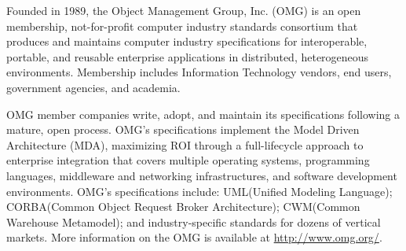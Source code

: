\documentclass[10pt, a4paper]{isov2}
\begin{document}
\renewcommand{\contentsname}{Table of Contents}
\tableofcontents


\cleardoublepage
{}




Founded in 1989, the Object Management Group, Inc. (OMG) is an open membership, not-for-profit 
computer industry standards consortium that produces and maintains computer industry specifications 
for interoperable, portable, and reusable enterprise applications in distributed, heterogeneous 
environments. Membership includes Information Technology vendors, end users, government agencies, 
 and academia. 

OMG member companies write, adopt, and maintain its specifications following a mature, open 
 process. OMG's specifications implement the Model Driven Architecture\textregistered \xspace 
 (MDA\textregistered\xspace), maximizing ROI 
  through a full-lifecycle approach to enterprise integration that covers multiple operating 
   systems, programming languages, middleware and networking infrastructures, and software 
    development environments. OMG's specifications include: UML\textregistered\xspace (Unified Modeling Language\texttrademark\xspace); 
	 CORBA\textregistered\xspace (Common Object Request Broker Architecture); CWM\texttrademark\xspace (Common Warehouse Metamodel); and 
	  industry-specific standards for dozens of vertical markets. 
More information on the OMG is available at \url{http://www.omg.org/}.


\end{document}
